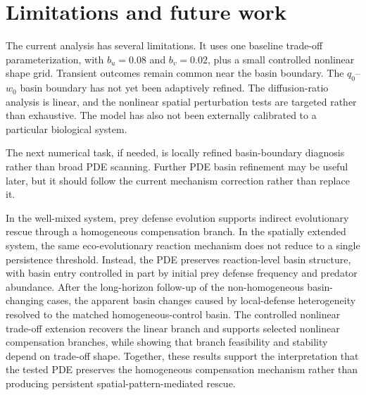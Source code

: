 \documentclass[11pt]{article}
\begin{document}
\section{Limitations and future work}

The current analysis has several limitations. It uses one baseline trade-off parameterization, with \(b_u=0.08\) and \(b_v=0.02\), plus a small controlled nonlinear shape grid. Transient outcomes remain common near the basin boundary. The \(q_0\)--\(w_0\) basin boundary has not yet been adaptively refined. The diffusion-ratio analysis is linear, and the nonlinear spatial perturbation tests are targeted rather than exhaustive. The model has also not been externally calibrated to a particular biological system.

The next numerical task, if needed, is locally refined basin-boundary diagnosis rather than broad PDE scanning. Further PDE basin refinement may be useful later, but it should follow the current mechanism correction rather than replace it.

In the well-mixed system, prey defense evolution supports indirect evolutionary rescue through a homogeneous compensation branch. In the spatially extended system, the same eco-evolutionary reaction mechanism does not reduce to a single persistence threshold. Instead, the PDE preserves reaction-level basin structure, with basin entry controlled in part by initial prey defense frequency and predator abundance. After the long-horizon follow-up of the non-homogeneous basin-changing cases, the apparent basin changes caused by local-defense heterogeneity resolved to the matched homogeneous-control basin. The controlled nonlinear trade-off extension recovers the linear branch and supports selected nonlinear compensation branches, while showing that branch feasibility and stability depend on trade-off shape. Together, these results support the interpretation that the tested PDE preserves the homogeneous compensation mechanism rather than producing persistent spatial-pattern-mediated rescue.



\end{document}
